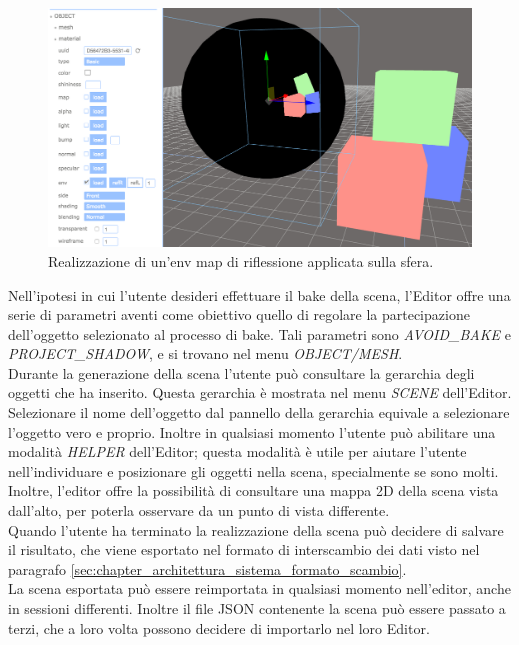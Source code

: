 \\
\begin{figure}[htb]
 \centering
 \includegraphics[width=1\linewidth]{images/chapter_caso_uso/caso_uso_envmap.png}\hfill
 \caption[Effetti riflessione/rifrazione]{Realizzazione di un'env map di riflessione applicata sulla sfera.}
 \label{fig:caso_uso_envmap}
\end{figure}
Nell’ipotesi in cui l’utente desideri effettuare il bake della scena, l’Editor offre una serie di parametri aventi come obiettivo quello di regolare la partecipazione dell’oggetto selezionato al processo di bake. Tali parametri sono \emph{AVOID\_BAKE} e \emph{PROJECT\_SHADOW}, e si trovano nel menu \emph{OBJECT/MESH}.
\\
Durante la generazione della scena l’utente può consultare la gerarchia degli oggetti che ha inserito. Questa gerarchia è mostrata nel menu \emph{SCENE} dell’Editor. 
\\
Selezionare il nome dell’oggetto dal pannello della gerarchia equivale a selezionare l’oggetto vero e proprio. 
Inoltre in qualsiasi momento l’utente può abilitare una modalità \emph{HELPER} dell’Editor; questa modalità è utile per aiutare l’utente nell’individuare e posizionare gli oggetti nella scena, specialmente se sono molti.
Inoltre, l’editor offre la possibilità di consultare una mappa 2D della scena vista dall’alto, per poterla osservare da un punto di vista differente.
\\
Quando l’utente ha terminato la realizzazione della scena può decidere di salvare il risultato, che viene esportato nel formato di interscambio dei dati visto nel paragrafo \ref{sec:chapter_architettura_sistema_formato_scambio}.
\\
La scena esportata può essere reimportata in qualsiasi momento nell’editor, anche in sessioni differenti. Inoltre il file JSON contenente la scena può essere passato a terzi, che a loro volta possono decidere di importarlo nel loro Editor.
